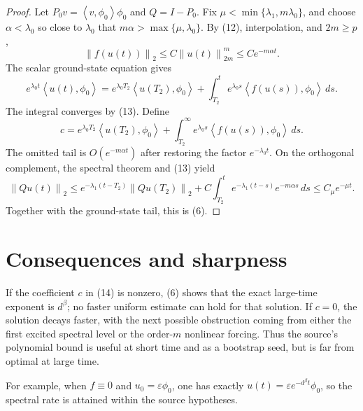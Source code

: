 \documentclass[11pt]{article}
\newcommand{\norm}[1]{\left\lVert #1\right\rVert}
\newcommand{\ip}[2]{\left\langle #1,#2\right\rangle}
\begin{document}
\begin{proof}
Let \(P_0v=\ip{v}{\phi_0}\phi_0\) and \(Q=I-P_0\).  Fix
\(\mu<\min\{\lambda_1,m\lambda_0\}\), and choose
\(\alpha<\lambda_0\) so close to \(\lambda_0\) that
\(m\alpha>\max\{\mu,\lambda_0\}\).
By (12), interpolation, and \(2m\geq p\),
\[
 \norm{f(u(t))}_2
 \leq C\norm{u(t)}_{2m}^m
 \leq C e^{-m\alpha t}.                                \tag{13}
\]
The scalar ground-state equation gives
\[
 e^{\lambda_0t}\ip{u(t)}{\phi_0}
 =e^{\lambda_0T_2}\ip{u(T_2)}{\phi_0}
 +\int_{T_2}^t e^{\lambda_0s}\ip{f(u(s))}{\phi_0}\,ds.
\]
The integral converges by (13).  Define
\begin{equation}
 c=e^{\lambda_0T_2}\ip{u(T_2)}{\phi_0}
 +\int_{T_2}^\infty e^{\lambda_0s}
     \ip{f(u(s))}{\phi_0}\,ds.                         \tag{14}
\end{equation}
The omitted tail is \(O(e^{-m\alpha t})\) after restoring the factor
\(e^{-\lambda_0t}\).  On the orthogonal complement, the spectral theorem
and (13) yield
\[
 \norm{Qu(t)}_2
 \leq e^{-\lambda_1(t-T_2)}\norm{Qu(T_2)}_2
 +C\int_{T_2}^t e^{-\lambda_1(t-s)}e^{-m\alpha s}\,ds
 \leq C_\mu e^{-\mu t}.
\]
Together with the ground-state tail, this is (6).
\end{proof}

\section*{Consequences and sharpness}
If the coefficient \(c\) in (14) is nonzero, (6) shows that the exact
large-time exponent is \(d^\beta\); no faster uniform estimate can hold for
that solution.  If \(c=0\), the solution decays faster, with the next
possible obstruction coming from either the first excited spectral level
or the order-\(m\) nonlinear forcing.  Thus the source's polynomial bound
is useful at short time and as a bootstrap seed, but is far from optimal at
large time.

For example, when \(f\equiv0\) and \(u_0=\varepsilon\phi_0\), one has
exactly \(u(t)=\varepsilon e^{-d^\beta t}\phi_0\), so the spectral rate is
attained within the source hypotheses.
\end{document}
